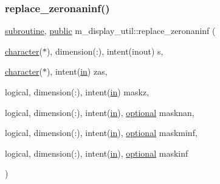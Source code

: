 \mbox{\label{namespacem__display__util_a72816de72f8a35ed93223a4bfd650c9b}} 
\subsubsection{\texorpdfstring{replace\+\_\+zeronaninf()}{replace\_zeronaninf()}}
{\footnotesize\ttfamily \hyperlink{M__stopwatch_83_8txt_acfbcff50169d691ff02d4a123ed70482}{subroutine}, \hyperlink{M__stopwatch_83_8txt_a2f74811300c361e53b430611a7d1769f}{public} m\+\_\+display\+\_\+util\+::replace\+\_\+zeronaninf (\begin{DoxyParamCaption}\item[{\hyperlink{option__stopwatch_83_8txt_abd4b21fbbd175834027b5224bfe97e66}{character}($\ast$), dimension(\+:), intent(inout)}]{s,  }\item[{\hyperlink{option__stopwatch_83_8txt_abd4b21fbbd175834027b5224bfe97e66}{character}($\ast$), intent(\hyperlink{M__journal_83_8txt_afce72651d1eed785a2132bee863b2f38}{in})}]{zas,  }\item[{logical, dimension(\+:), intent(\hyperlink{M__journal_83_8txt_afce72651d1eed785a2132bee863b2f38}{in})}]{maskz,  }\item[{logical, dimension(\+:), intent(\hyperlink{M__journal_83_8txt_afce72651d1eed785a2132bee863b2f38}{in}), \hyperlink{option__stopwatch_83_8txt_aa4ece75e7acf58a4843f70fe18c3ade5}{optional}}]{masknan,  }\item[{logical, dimension(\+:), intent(\hyperlink{M__journal_83_8txt_afce72651d1eed785a2132bee863b2f38}{in}), \hyperlink{option__stopwatch_83_8txt_aa4ece75e7acf58a4843f70fe18c3ade5}{optional}}]{maskminf,  }\item[{logical, dimension(\+:), intent(\hyperlink{M__journal_83_8txt_afce72651d1eed785a2132bee863b2f38}{in}), \hyperlink{option__stopwatch_83_8txt_aa4ece75e7acf58a4843f70fe18c3ade5}{optional}}]{maskinf }\end{DoxyParamCaption})}

\mbox{\label{namespacem__display__util_a3fa60429ffcc82a33032d718cbe03e87}} 
